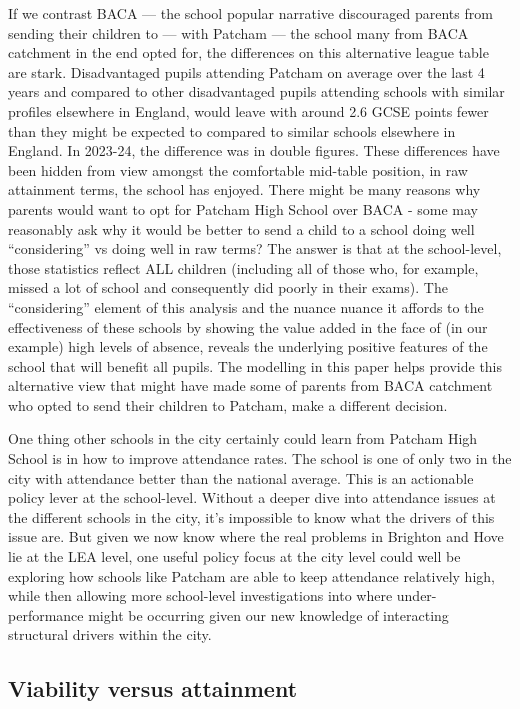 \documentclass[
  12pt,
  titlepage]{article}
\begin{document}
If we contrast BACA --- the school popular narrative discouraged parents
from sending their children to --- with Patcham --- the school many from
BACA catchment in the end opted for, the differences on this alternative
league table are stark. Disadvantaged pupils attending Patcham on
average over the last 4 years and compared to other disadvantaged pupils
attending schools with similar profiles elsewhere in England, would
leave with around 2.6 GCSE points fewer than they might be expected to
compared to similar schools elsewhere in England. In 2023-24, the
difference was in double figures. These differences have been hidden
from view amongst the comfortable mid-table position, in raw attainment
terms, the school has enjoyed. There might be many reasons why parents
would want to opt for Patcham High School over BACA - some may
reasonably ask why it would be better to send a child to a school doing
well ``considering'' vs doing well in raw terms? The answer is that at
the school-level, those statistics reflect ALL children (including all
of those who, for example, missed a lot of school and consequently did
poorly in their exams). The ``considering'' element of this analysis and
the nuance nuance it affords to the effectiveness of these schools by
showing the value added in the face of (in our example) high levels of
absence, reveals the underlying positive features of the school that
will benefit all pupils. The modelling in this paper helps provide this
alternative view that might have made some of parents from BACA
catchment who opted to send their children to Patcham, make a different
decision.

One thing other schools in the city certainly could learn from Patcham
High School is in how to improve attendance rates. The school is one of
only two in the city with attendance better than the national average.
This is an actionable policy lever at the school-level. Without a deeper
dive into attendance issues at the different schools in the city, it's
impossible to know what the drivers of this issue are. But given we now
know where the real problems in Brighton and Hove lie at the LEA level,
one useful policy focus at the city level could well be exploring how
schools like Patcham are able to keep attendance relatively high, while
then allowing more school-level investigations into where
under-performance might be occurring given our new knowledge of
interacting structural drivers within the city.

\subsection{Viability versus
attainment}\label{viability-versus-attainment}
\end{document}
